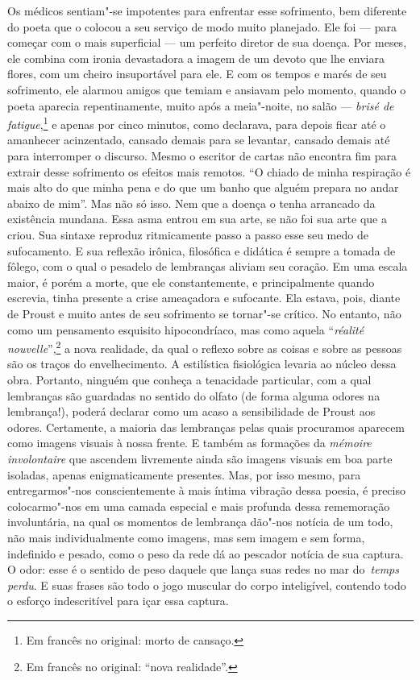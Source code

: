 Os médicos sentiam"-se impotentes para enfrentar esse sofrimento, bem
diferente do poeta que o colocou a seu serviço de modo muito planejado.
Ele foi --- para começar com o mais superficial --- um perfeito diretor de
sua doença. Por meses, ele combina com ironia devastadora a imagem de um
devoto que lhe enviara flores, com um cheiro insuportável para ele. E
com os tempos e marés de seu sofrimento, ele alarmou amigos que temiam e
ansiavam pelo momento, quando o poeta aparecia repentinamente, muito
após a meia"-noite, no salão --- \emph{brisé de fatigue},\footnote{Em francês no original:
  morto de cansaço. \versal{[N.~T.]}} e apenas por cinco minutos, como declarava, para
depois ficar até o amanhecer acinzentado, cansado demais para se
levantar, cansado demais até para interromper o discurso. Mesmo o
escritor de cartas não encontra fim para extrair desse sofrimento os
efeitos mais remotos. ``O chiado de minha respiração é mais alto do que
minha pena e do que um banho que alguém prepara no andar abaixo de
mim''. Mas não só isso. Nem que a doença o tenha arrancado da existência
mundana. Essa asma entrou em sua arte, se não foi sua arte que a criou.
Sua sintaxe reproduz ritmicamente passo a passo esse seu medo de
sufocamento. E sua reflexão irônica, filosófica e didática é sempre a
tomada de fôlego, com o qual o pesadelo de lembranças aliviam seu
coração. Em uma escala maior, é porém a morte, que ele constantemente,
e principalmente quando escrevia, tinha presente a crise ameaçadora e
sufocante. Ela estava, pois, diante de Proust e muito antes de seu
sofrimento se tornar"-se crítico. No entanto, não como um pensamento
esquisito hipocondríaco, mas como aquela ``\emph{réalité nouvelle}'',\footnote{Em francês no original: ``nova realidade''. \versal{[N.~T.]}} a nova realidade,
da qual o reflexo sobre as coisas e sobre as pessoas são os traços do
envelhecimento. A estilística fisiológica levaria ao núcleo dessa obra.
Portanto, ninguém que conheça a tenacidade particular, com a qual
lembranças são guardadas no sentido do olfato (de forma alguma odores na
lembrança!), poderá declarar como um acaso a sensibilidade de Proust aos
odores. Certamente, a maioria das lembranças pelas quais procuramos
aparecem como imagens visuais à nossa frente. E também as formações da
\emph{mémoire} \emph{involontaire} que ascendem livremente ainda são
imagens visuais em boa parte isoladas, apenas enigmaticamente presentes.
Mas, por isso mesmo, para entregarmos"-nos conscientemente à mais íntima
vibração dessa poesia, é preciso colocarmo"-nos em uma camada especial e
mais profunda dessa rememoração involuntária, na qual os momentos de
lembrança dão"-nos notícia de um todo, não mais individualmente como
imagens, mas sem imagem e sem forma, indefinido e pesado, como o peso da
rede dá ao pescador notícia de sua captura. O odor: esse é o sentido de
peso daquele que lança suas redes no mar do~\emph{temps perdu}. E suas
frases são todo o jogo muscular do corpo inteligível, contendo todo o
esforço indescritível para içar essa captura.

